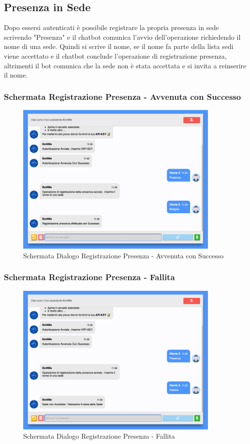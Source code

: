 \subsection{Presenza in Sede}
Dopo essersi autenticati è possibile registrare la propria presenza in sede scrivendo "Presenza" e il chatbot comunica l'avvio dell'operazione richiedendo il nome di una sede. 
Quindi si scrive il nome, se il nome fa parte della lista sedi viene accettato e il chatbot conclude l'operazione di registrazione presenza, altrimenti il bot comunica che la sede non è stata accettata e si invita a reinserire il nome. 
\subsubsection{Schermata Registrazione Presenza - Avvenuta con Successo}
\begin{figure}[H]
    \centering\includegraphics[width=0.9\textwidth, height=0.7\textheight, keepaspectratio]{images/schermata_presenza_successo.png}
    \caption{Schermata Dialogo Registrazione Presenza - Avvenuta con Successo}
\end{figure}

\subsubsection{Schermata Registrazione Presenza - Fallita}
\begin{figure}[H]
    \centering\includegraphics[width=0.9\textwidth, height=0.7\textheight, keepaspectratio]{images/schermata_presenza_fallita.png}
    \caption{Schermata Dialogo Registrazione Presenza - Fallita}
\end{figure}